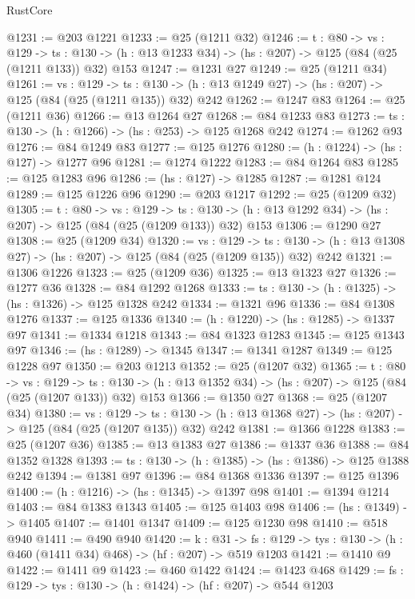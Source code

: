 \begin{lexlean}{RustCore}
\begin{coremodule}
@1231 := @203 @1221
@1233 := @25 (@1211 @32)
@1246 := {t : @80} ->
  {vs : @129} ->
  {ts : @130} -> (h : @13 @1233 @34) -> (hs : @207) -> @125 (@84 (@25 (@1211 @133)) @32) @153
@1247 := @1231 @27
@1249 := @25 (@1211 @34)
@1261 := {vs : @129} ->
  {ts : @130} -> (h : @13 @1249 @27) -> (hs : @207) -> @125 (@84 (@25 (@1211 @135)) @32) @242
@1262 := @1247 @83
@1264 := @25 (@1211 @36)
@1266 := @13 @1264 @27
@1268 := @84 @1233 @83
@1273 := {ts : @130} -> (h : @1266) -> (hs : @253) -> @125 @1268 @242
@1274 := @1262 @93
@1276 := @84 @1249 @83
@1277 := @125 @1276
@1280 := (h : @1224) -> (hs : @127) -> @1277 @96
@1281 := @1274 @1222
@1283 := @84 @1264 @83
@1285 := @125 @1283 @96
@1286 := (hs : @127) -> @1285
@1287 := @1281 @124
@1289 := @125 @1226 @96
@1290 := @203 @1217
@1292 := @25 (@1209 @32)
@1305 := {t : @80} ->
  {vs : @129} ->
  {ts : @130} -> (h : @13 @1292 @34) -> (hs : @207) -> @125 (@84 (@25 (@1209 @133)) @32) @153
@1306 := @1290 @27
@1308 := @25 (@1209 @34)
@1320 := {vs : @129} ->
  {ts : @130} -> (h : @13 @1308 @27) -> (hs : @207) -> @125 (@84 (@25 (@1209 @135)) @32) @242
@1321 := @1306 @1226
@1323 := @25 (@1209 @36)
@1325 := @13 @1323 @27
@1326 := @1277 @36
@1328 := @84 @1292 @1268
@1333 := {ts : @130} -> (h : @1325) -> (hs : @1326) -> @125 @1328 @242
@1334 := @1321 @96
@1336 := @84 @1308 @1276
@1337 := @125 @1336
@1340 := (h : @1220) -> (hs : @1285) -> @1337 @97
@1341 := @1334 @1218
@1343 := @84 @1323 @1283
@1345 := @125 @1343 @97
@1346 := (hs : @1289) -> @1345
@1347 := @1341 @1287
@1349 := @125 @1228 @97
@1350 := @203 @1213
@1352 := @25 (@1207 @32)
@1365 := {t : @80} ->
  {vs : @129} ->
  {ts : @130} -> (h : @13 @1352 @34) -> (hs : @207) -> @125 (@84 (@25 (@1207 @133)) @32) @153
@1366 := @1350 @27
@1368 := @25 (@1207 @34)
@1380 := {vs : @129} ->
  {ts : @130} -> (h : @13 @1368 @27) -> (hs : @207) -> @125 (@84 (@25 (@1207 @135)) @32) @242
@1381 := @1366 @1228
@1383 := @25 (@1207 @36)
@1385 := @13 @1383 @27
@1386 := @1337 @36
@1388 := @84 @1352 @1328
@1393 := {ts : @130} -> (h : @1385) -> (hs : @1386) -> @125 @1388 @242
@1394 := @1381 @97
@1396 := @84 @1368 @1336
@1397 := @125 @1396
@1400 := (h : @1216) -> (hs : @1345) -> @1397 @98
@1401 := @1394 @1214
@1403 := @84 @1383 @1343
@1405 := @125 @1403 @98
@1406 := (hs : @1349) -> @1405
@1407 := @1401 @1347
@1409 := @125 @1230 @98
@1410 := @518 @940
@1411 := @490 @940
@1420 := {k : @31} ->
  {fs : @129} -> {tys : @130} -> (h : @460 (@1411 @34) @468) -> (hf : @207) -> @519 @1203
@1421 := @1410 @9
@1422 := @1411 @9
@1423 := @460 @1422
@1424 := @1423 @468
@1429 := {fs : @129} -> {tys : @130} -> (h : @1424) -> (hf : @207) -> @544 @1203

\end{coremodule}
\end{lexlean}
